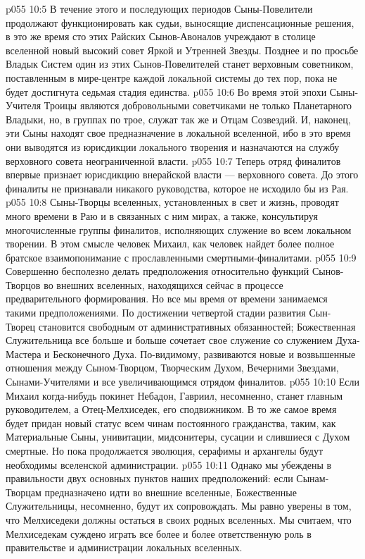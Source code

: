 \vs p055 10:5 В течение этого и последующих периодов Сыны\hyp{}Повелители продолжают функционировать как судьи, выносящие диспенсационные решения, в это же время сто этих Райских Сынов\hyp{}Авоналов учреждают в столице вселенной новый высокий совет Яркой и Утренней Звезды. Позднее и по просьбе Владык Систем один из этих Сынов\hyp{}Повелителей станет верховным советником, поставленным в мире\hyp{}центре каждой локальной системы до тех пор, пока не будет достигнута седьмая стадия единства.
\vs p055 10:6 Во время этой эпохи Сыны\hyp{}Учителя Троицы являются добровольными советчиками не только Планетарного Владыки, но, в группах по трое, служат так же и Отцам Созвездий. И, наконец, эти Сыны находят свое предназначение в локальной вселенной, ибо в это время они выводятся из юрисдикции локального творения и назначаются на службу верховного совета неограниченной власти.
\vs p055 10:7 \pc Теперь отряд финалитов впервые признает юрисдикцию внерайской власти --- верховного совета. До этого финалиты не признавали никакого руководства, которое не исходило бы из Рая.
\vs p055 10:8 Сыны\hyp{}Творцы вселенных, установленных в свет и жизнь, проводят много времени в Раю и в связанных с ним мирах, а также, консультируя многочисленные группы финалитов, исполняющих служение во всем локальном творении. В этом смысле человек Михаил, как человек найдет более полное братское взаимопонимание с прославленными смертными\hyp{}финалитами.
\vs p055 10:9 \pc Совершенно бесполезно делать предположения относительно функций Сынов\hyp{}Творцов во внешних вселенных, находящихся сейчас в процессе предварительного формирования. Но все мы время от времени занимаемся такими предположениями. По достижении четвертой стадии развития Сын\hyp{}Творец становится свободным от административных обязанностей; Божественная Служительница все больше и больше сочетает свое служение со служением Духа\hyp{}Мастера и Бесконечного Духа. По\hyp{}видимому, развиваются новые и возвышенные отношения между Сыном\hyp{}Творцом, Творческим Духом, Вечерними Звездами, Сынами\hyp{}Учителями и все увеличивающимся отрядом финалитов.
\vs p055 10:10 Если Михаил когда\hyp{}нибудь покинет Небадон, Гавриил, несомненно, станет главным руководителем, а Отец\hyp{}Мелхиседек, его сподвижником. В то же самое время будет придан новый статус всем чинам постоянного гражданства, таким, как Материальные Сыны, унивитации, мидсонитеры, сусации и слившиеся с Духом смертные. Но пока продолжается эволюция, серафимы и архангелы будут необходимы вселенской администрации.
\vs p055 10:11 Однако мы убеждены в правильности двух основных пунктов наших предположений: если Сынам\hyp{}Творцам предназначено идти во внешние вселенные, Божественные Служительницы, несомненно, будут их сопровождать. Мы равно уверены в том, что Мелхиседеки должны остаться в своих родных вселенных. Мы считаем, что Мелхиседекам суждено играть все более и более ответственную роль в правительстве и администрации локальных вселенных.
